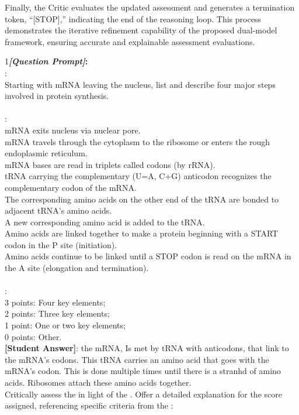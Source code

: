 Finally, the Critic evaluates the updated assessment and generates a termination token, ``[STOP],'' indicating the end of the reasoning loop. This process demonstrates the iterative refinement capability of the proposed dual-model framework, ensuring accurate and explainable assessment evaluations.

\begin{figure*}
\begin{tcolorbox}[
    colback=gray!10,      %
    colframe=gray!80,     %
    title=Case Study 1,
    fonttitle=\bfseries,  %
    rounded corners,
    boxrule=0.5mm,        %
    width=\linewidth
]
\scriptsize
\textcircled{\raisebox{-0.3pt} {\scriptsize1}}\textbf{\emph{[Question Prompt]}:}\\
\text{[Question]}: \\
Starting with mRNA leaving the nucleus, list and describe four major steps involved in protein synthesis. \\\\
:\\mRNA exits nucleus via nuclear pore.\\mRNA travels through the cytoplasm to the ribosome or enters the rough endoplasmic reticulum.\\mRNA bases are read in triplets called codons (by rRNA).\\tRNA carrying the complementary (U=A, C+G) anticodon recognizes the complementary codon of the mRNA.\\The corresponding amino acids on the other end of the tRNA are bonded to adjacent tRNA's amino acids.\\A new corresponding amino acid is added to the tRNA.\\Amino acids are linked together to make a protein beginning with a START codon in the P site (initiation).\\Amino acids continue to be linked until a STOP codon is read on the mRNA in the A site (elongation and termination).\\\\:\\3 points: Four key elements;\\2 points: Three key elements;\\1 point: One or two key elements;\\0 points: Other.\\\textbf{[Student Answer]}: the mRNA, Is met by tRNA with anticodons, that link to the mRNA's codons. This tRNA carries an amino acid that goes with the mRNA's codon. This is done multiple times until there is a stranhd of amino acids. Ribosomes attach these amino acids together.\\Critically assess the  in light of the . Offer a detailed explanation for the score assigned, referencing specific criteria from the :\\ 

\end{tcolorbox}
\end{figure*}
